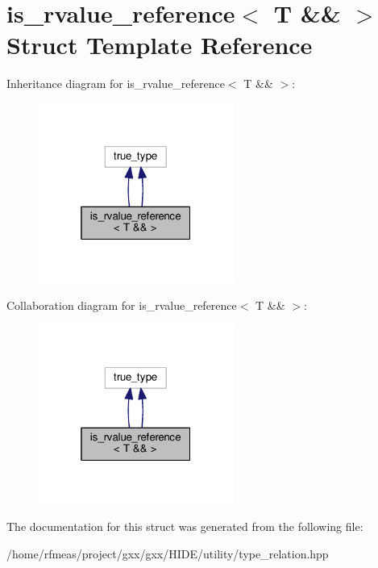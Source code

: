 \hypertarget{structis__rvalue__reference_3_01T_01_6_6_01_4}{}\section{is\+\_\+rvalue\+\_\+reference$<$ T \&\& $>$ Struct Template Reference}
\label{structis__rvalue__reference_3_01T_01_6_6_01_4}


Inheritance diagram for is\+\_\+rvalue\+\_\+reference$<$ T \&\& $>$\+:
\nopagebreak
\begin{figure}[H]
\begin{center}
\leavevmode
\includegraphics[width=181pt]{structis__rvalue__reference_3_01T_01_6_6_01_4__inherit__graph}
\end{center}
\end{figure}


Collaboration diagram for is\+\_\+rvalue\+\_\+reference$<$ T \&\& $>$\+:
\nopagebreak
\begin{figure}[H]
\begin{center}
\leavevmode
\includegraphics[width=181pt]{structis__rvalue__reference_3_01T_01_6_6_01_4__coll__graph}
\end{center}
\end{figure}


The documentation for this struct was generated from the following file\+:\begin{DoxyCompactItemize}
\item 
/home/rfmeas/project/gxx/gxx/\+H\+I\+D\+E/utility/type\+\_\+relation.\+hpp\end{DoxyCompactItemize}
